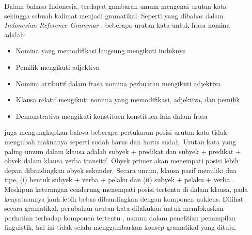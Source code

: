 Dalam bahasa Indonesia, terdapat gambaran umum mengenai urutan kata sehingga sebuah kalimat menjadi gramatikal. Seperti yang dibahas dalam \textit{Indonesian Reference Grammar} \citep{sneddon2010indonesian}, beberapa urutan kata untuk frasa nomina adalah:
\begin{itemize}
\item Nomina yang memodifikasi langsung mengikuti induknya
\item Pemilik mengikuti adjektiva
\item Nomina atributif dalam frasa nomina perbuatan mengikuti adjektiva
\item Klausa relatif mengikuti nomina yang memodifikasi, adjektiva, dan pemilik
\item Demonstrativa mengikuti konstituen-konstituen lain dalam frasa
\end{itemize}

\cite{sneddon2010indonesian} juga mengungkapkan bahwa beberapa pertukaran posisi urutan kata tidak mengubah maknanya seperti sudah harus dan harus sudah. Urutan kata yang paling umum dalam klausa adalah subyek + predikat dan subyek + predikat + obyek dalam klausa verba transitif. Obyek primer akan menempati posisi lebih depan dibandingkan obyek sekunder. Secara umum, klausa pasif memiliki dua tipe, (i) bentuk subyek + verba + pelaku dan (ii) subyek + pelaku + verba \citep{sneddon2010indonesian}. Meskipun keterangan cenderung menempati posisi tertentu di dalam klausa, pada kenyataannya jauh lebih bebas dibandingkan dengan komponen nukleus. Dilihat secara gramatikal, perubahan urutan kata dilakukan untuk memfokuskan perhatian terhadap komponen tertentu \citep{sneddon2010indonesian}, namun dalam penelitian penampilan linguistik, hal ini tidak selalu menggambarkan konsep gramatikal yang dituju.

